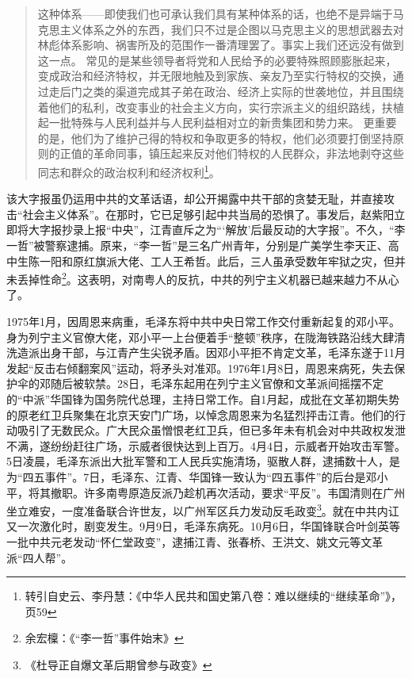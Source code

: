 \begin{quote}

这种体系——即使我们也可承认我们具有某种体系的话，也绝不是异端于马克思主义体系之外的东西，我们只不过是企图以马克思主义的思想武器去对林彪体系影响、祸害所及的范围作一番清理罢了。事实上我们还远没有做到这一点。
常见的是某些领导者将党和人民给予的必要特殊照顾膨胀起来，变成政治和经济特权，并无限地触及到家族、亲友乃至实行特权的交换，通过走后门之类的渠道完成其子弟在政治、经济上实际的世袭地位，并且围绕着他们的私利，改变事业的社会主义方向，实行宗派主义的组织路线，扶植起一批特殊与人民利益并与人民利益相对立的新贵集团和势力来。
更重要的是，他们为了维护己得的特权和争取更多的特权，他们必须要打倒坚持原则的正值的革命同事，镇压起来反对他们特权的人民群众，非法地剥夺这些同志和群众的政治权利和经济权利\footnote{转引自史云、李丹慧：《中华人民共和国史第八卷：难以继续的“继续革命”》，页59}。

\end{quote}

该大字报虽仍运用中共的文革话语，却公开揭露中共干部的贪婪无耻，并直接攻击“社会主义体系”。在那时，它已足够引起中共当局的恐惧了。事发后，赵紫阳立即将大字报抄录上报“中央”，江青直斥之为“‘解放’后最反动的大字报”。不久，“李一哲”被警察逮捕。原来，“李一哲”是三名广州青年，分别是广美学生李天正、高中生陈一阳和原红旗派大佬、工人王希哲。此后，三人虽承受数年牢狱之灾，但并未丢掉性命\footnote{余宏檁：《“李一哲”事件始末》}。这表明，对南粤人的反抗，中共的列宁主义机器已越来越力不从心了。

1975年1月，因周恩来病重，毛泽东将中共中央日常工作交付重新起复的邓小平。身为列宁主义官僚大佬，邓小平一上台便着手“整顿”秩序，在陇海铁路沿线大肆清洗造派出身干部，与江青产生尖锐矛盾。因邓小平拒不肯定文革，毛泽东遂于11月发起“反击右倾翻案风”运动，将矛头对准邓。1976年1月8日，周恩来病死，失去保护伞的邓随后被软禁。28日，毛泽东起用在列宁主义官僚和文革派间摇摆不定的“中派”华国锋为国务院代总理，主持日常工作。自1月起，成批在文革初期失势的原老红卫兵聚集在北京天安门广场，以悼念周恩来为名猛烈抨击江青。他们的行动吸引了无数民众。广大民众虽憎恨老红卫兵，但已多年未有机会对中共政权发泄不满，遂纷纷赶往广场，示威者很快达到上百万。4月4日，示威者开始攻击军警。5日凌晨，毛泽东派出大批军警和工人民兵实施清场，驱散人群，逮捕数十人，是为“四五事件”。7日，毛泽东、江青、华国锋一致认为“四五事件”的后台是邓小平，将其撤职。许多南粤原造反派乃趁机再次活动，要求“平反”。韦国清则在广州坐立难安，一度准备联合许世友，以广州军区兵力发动反毛政变\footnote{《杜导正自爆文革后期曾参与政变》}。就在中共内讧又一次激化时，剧变发生。9月9日，毛泽东病死。10月6日，华国锋联合叶剑英等一批中共元老发动“怀仁堂政变”，逮捕江青、张春桥、王洪文、姚文元等文革派“四人帮”。

